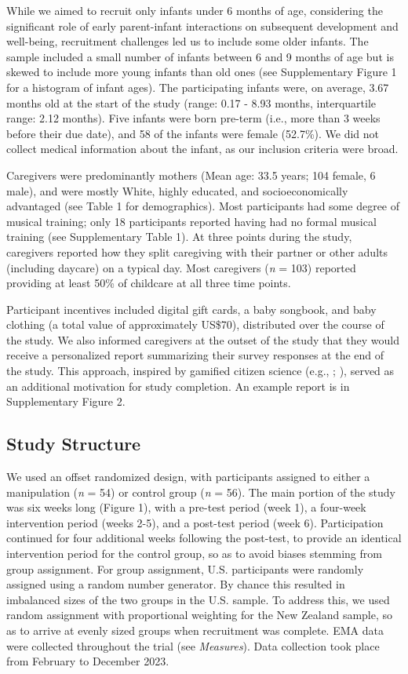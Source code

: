 \documentclass[
]{article}
\begin{document}
While we aimed to recruit only infants under 6 months of age,
considering the significant role of early parent-infant interactions on
subsequent development and well-being, recruitment challenges led us to
include some older infants. The sample included a small number of
infants between 6 and 9 months of age but is skewed to include more
young infants than old ones (see Supplementary Figure 1 for a histogram
of infant ages). The participating infants were, on average, 3.67 months
old at the start of the study (range: 0.17 - 8.93 months, interquartile
range: 2.12 months). Five infants were born pre-term (i.e., more than 3
weeks before their due date), and 58 of the infants were female
(52.7\%). We did not collect medical information about the infant, as
our inclusion criteria were broad.

Caregivers were predominantly mothers (Mean age: 33.5 years; 104 female,
6 male), and were mostly White, highly educated, and socioeconomically
advantaged (see Table 1 for demographics). Most participants had some
degree of musical training; only 18 participants reported having had no
formal musical training (see Supplementary Table 1). At three points
during the study, caregivers reported how they split caregiving with
their partner or other adults (including daycare) on a typical day. Most
caregivers (\emph{n} = 103) reported providing at least 50\% of
childcare at all three time points.

Participant incentives included digital gift cards, a baby songbook, and
baby clothing (a total value of approximately US\$70), distributed over
the course of the study. We also informed caregivers at the outset of
the study that they would receive a personalized report summarizing
their survey responses at the end of the study. This approach, inspired
by gamified citizen science (e.g., ; ), served as an
additional motivation for study completion. An example report is in
Supplementary Figure 2.

\subsection{Study Structure}\label{study-structure}

We used an offset randomized design, with participants assigned to
either a manipulation (\emph{n} = 54) or control group (\emph{n} = 56).
The main portion of the study was six weeks long (Figure 1), with a
pre-test period (week 1), a four-week intervention period (weeks 2-5),
and a post-test period (week 6). Participation continued for four
additional weeks following the post-test, to provide an identical
intervention period for the control group, so as to avoid biases
stemming from group assignment. For group assignment, U.S. participants
were randomly assigned using a random number generator. By chance this
resulted in imbalanced sizes of the two groups in the U.S. sample. To
address this, we used random assignment with proportional weighting for
the New Zealand sample, so as to arrive at evenly sized groups when
recruitment was complete. EMA data were collected throughout the trial
(see \emph{Measures}). Data collection took place from February to
December 2023.
\end{document}
